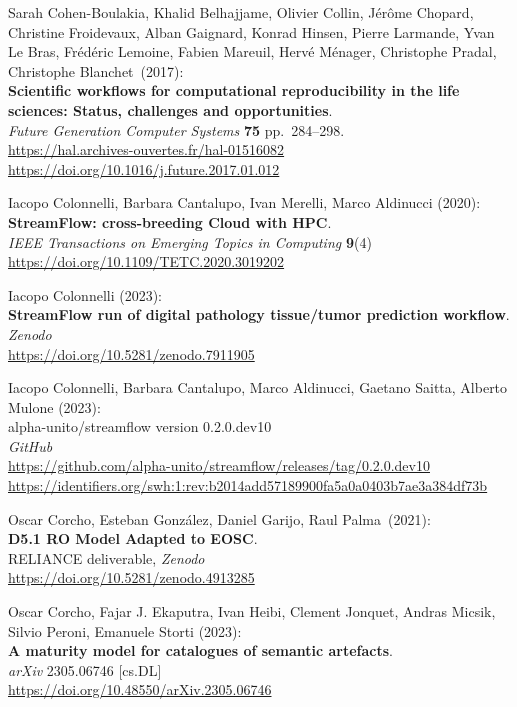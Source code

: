 \begin{thebibliography}{9}
Sarah Cohen-Boulakia, Khalid Belhajjame, Olivier Collin, Jérôme
Chopard, Christine Froidevaux, Alban Gaignard, Konrad Hinsen, Pierre
Larmande, Yvan Le Bras, Frédéric Lemoine, Fabien Mareuil, Hervé Ménager,
Christophe Pradal, Christophe Blanchet~(2017):\\
\textbf{Scientific workflows for computational reproducibility in the
life sciences: Status, challenges and opportunities}.\\
\emph{Future Generation Computer Systems} \textbf{75} pp.~284--298.\\
\url{https://hal.archives-ouvertes.fr/hal-01516082}\\
\url{https://doi.org/10.1016/j.future.2017.01.012}

Iacopo Colonnelli, Barbara Cantalupo, Ivan Merelli, Marco Aldinucci (2020):\\
\textbf{StreamFlow: cross-breeding Cloud with HPC}.\\
\emph{IEEE Transactions on Emerging Topics in Computing} \textbf{9}(4)\\
\url{https://doi.org/10.1109/TETC.2020.3019202}

Iacopo Colonnelli (2023):\\
\textbf{StreamFlow run of digital pathology tissue/tumor prediction workflow}.\\
\emph{Zenodo}\\
\url{https://doi.org/10.5281/zenodo.7911905}

 Iacopo Colonnelli, Barbara Cantalupo, Marco Aldinucci, Gaetano Saitta, Alberto Mulone (2023):\\
alpha-unito/streamflow version 0.2.0.dev10\\
\emph{GitHub}\\
\url{https://github.com/alpha-unito/streamflow/releases/tag/0.2.0.dev10}\\
\url{https://identifiers.org/swh:1:rev:b2014add57189900fa5a0a0403b7ae3a384df73b}


Oscar Corcho, Esteban González, Daniel Garijo, Raul Palma~(2021):\\
\textbf{D5.1 RO Model Adapted to EOSC}.\\
RELIANCE deliverable, \emph{Zenodo}\\
\url{https://doi.org/10.5281/zenodo.4913285}

Oscar Corcho, Fajar J. Ekaputra, Ivan Heibi, Clement Jonquet, Andras
Micsik, Silvio Peroni, Emanuele Storti (2023): \\
\textbf{A maturity model for catalogues of semantic artefacts}. \\
\emph{arXiv} 2305.06746 [cs.DL] \\
\url{https://doi.org/10.48550/arXiv.2305.06746}


\end{thebibliography}

